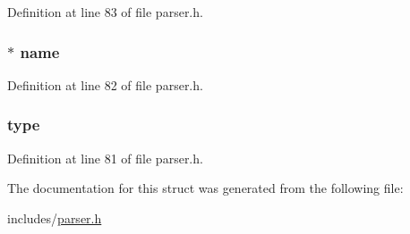 Definition at line 83 of file parser.\+h.

\hypertarget{structvariable__define__ast__node_a0be25b04f38aae29e2dd7c1b72d4797c}{
\subsubsection[{name}]{$\ast$ name}}\label{structvariable__define__ast__node_a0be25b04f38aae29e2dd7c1b72d4797c}


Definition at line 82 of file parser.\+h.

\hypertarget{structvariable__define__ast__node_aa117a93354fa3056f51378be7065ce33}{
\subsubsection[{type}]{ type}}\label{structvariable__define__ast__node_aa117a93354fa3056f51378be7065ce33}


Definition at line 81 of file parser.\+h.



The documentation for this struct was generated from the following file\+:\begin{DoxyCompactItemize}
\item 
includes/\hyperlink{parser_8h}{parser.\+h}\end{DoxyCompactItemize}
